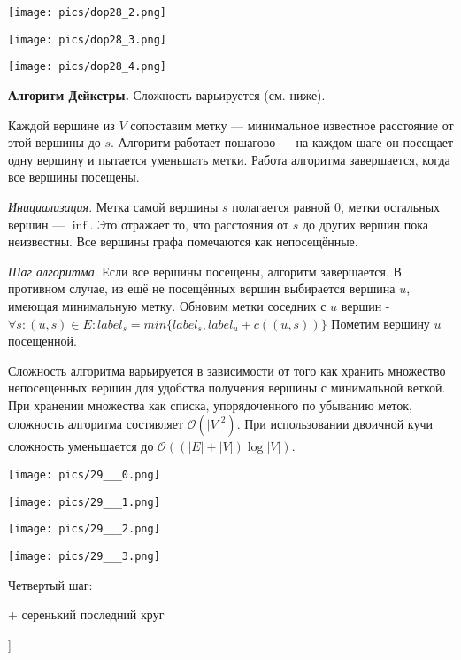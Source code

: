 \texttt{[image: pics/dop28\_2.png]}

\texttt{[image: pics/dop28\_3.png]}

\texttt{[image: pics/dop28\_4.png]}

\textbf{Алгоритм Дейкстры.} 
Сложность варьируется (см. ниже). 

Каждой вершине из $V$ сопоставим метку --- минимальное известное расстояние от этой вершины до $s$. 
Алгоритм работает пошагово --- на каждом шаге он посещает одну вершину и пытается уменьшать метки. 
Работа алгоритма завершается, когда все вершины посещены.

\textit{Инициализация}. 
Метка самой вершины $s$ полагается равной 0, метки остальных вершин --- $\inf$.
Это отражает то, что расстояния от $s$ до других вершин пока неизвестны. 
Все вершины графа помечаются как непосещённые.

\textit{Шаг алгоритма}. 
Если все вершины посещены, алгоритм завершается. 
В противном случае, из ещё не посещённых вершин выбирается вершина $u$, имеющая минимальную метку. 
Обновим метки соседних с $u$ вершин - $\forall s: (u,s) \in E: label_s = min\{label_s, label_u + c((u, s))\}$
Пометим вершину $u$ посещенной.

Сложность алгоритма варьируется в зависимости от того как хранить множество непосещенных вершин для удобства получения вершины с минимальной веткой. При хранении множества как списка, упорядоченного по убыванию меток, сложность алгоритма состявляет $\mathcal{O}(|V|^2)$. При использовании двоичной кучи сложность уменьшается до $\mathcal{O}((|E| + |V|) \log|V|)$.


\texttt{[image: pics/29\_\_\_0.png]}

\texttt{[image: pics/29\_\_\_1.png]}

\texttt{[image: pics/29\_\_\_2.png]}

\texttt{[image: pics/29\_\_\_3.png]}

Четвертый шаг:

+ серенький последний круг

\bigbreak
[\cite[page 69-96]{replace_me}]
